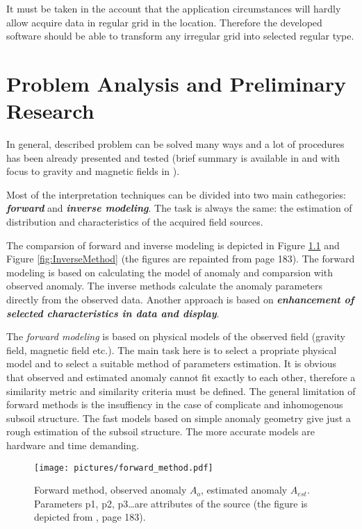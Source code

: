 \documentclass[FM]{tulthesis}
\begin{document}
It must be taken in the account that the application circumstances will hardly allow acquire data in regular grid in the location. Therefore the developed software should be able to transform any irregular grid into selected regular type. 


\chapter{Problem Analysis and Preliminary Research} \label{chap:analysis}
In general, described problem can be solved many ways and a lot of procedures has been already presented and tested (brief summary is available in \cite{Mares} and with focus to gravity and magnetic fields in \cite{Blakely}). 

Most of the interpretation techniques can be divided into two main cathegories: \textbf{\emph{forward}} and \textbf{\emph{inverse modeling}}. The task is always the same: the estimation of distribution and characteristics of the acquired field sources. 

The comparsion of forward and inverse modeling is depicted in Figure \ref{fig:ForwardMethod} and Figure \ref{fig:InverseMethod} (the figures are repainted from \cite{Blakely} page 183). The forward modeling is based on calculating the model of anomaly and comparsion with observed anomaly. The inverse methods calculate the anomaly parameters directly from the observed data. Another approach is based on \textbf{\emph{enhancement of selected characteristics in data and display}}.

The \emph{forward modeling} is based on physical models of the observed field (gravity field, magnetic field etc.). The main task here is to select a propriate physical model and to select a suitable method of parameters estimation. It is obvious that observed and estimated anomaly cannot fit exactly to each other, therefore a similarity metric and similarity criteria must be defined. The general limitation of forward methods is the insuffiency in the case of complicate and inhomogenous subsoil structure. The fast models based on simple anomaly geometry give just a rough estimation of the subsoil structure. The more accurate models are hardware and time demanding. 

\begin{figure}[ht]
\centerline{\texttt{[image: pictures/forward\_method.pdf]}}
\renewcommand{\figurename}{Figure}
\caption[Forward method]{Forward method, observed anomaly $A_{o}$, estimated anomaly $A_{est}$. Parameters p1, p2, p3\dots are attributes of the source (the figure is depicted from \cite{Blakely}, page 183).}
\label{fig:ForwardMethod}
\end{figure}
\end{document}
